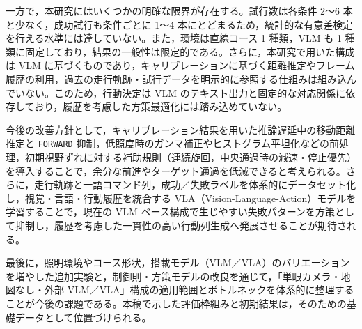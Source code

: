 \documentclass[a4paper,11pt]{ltjsreport}
\begin{document}
一方で，本研究にはいくつかの明確な限界が存在する。試行数は各条件 2〜6 本と少なく，成功試行も条件ごとに 1〜4 本にとどまるため，統計的な有意差検定を行える水準には達していない。また，環境は直線コース 1 種類，VLM も 1 種類に固定しており，結果の一般性は限定的である。さらに，本研究で用いた構成は VLM に基づくものであり，キャリブレーションに基づく距離推定やフレーム履歴の利用，過去の走行軌跡・試行データを明示的に参照する仕組みは組み込んでいない。このため，行動決定は VLM のテキスト出力と固定的な対応関係に依存しており，履歴を考慮した方策最適化には踏み込めていない。

今後の改善方針として，キャリブレーション結果を用いた推論遅延中の移動距離推定と \texttt{FORWARD} 抑制，低照度時のガンマ補正やヒストグラム平坦化などの前処理，初期視野ずれに対する補助規則（連続旋回，中央通過時の減速・停止優先）を導入することで，余分な前進やターゲット通過を低減できると考えられる。さらに，走行軌跡と一語コマンド列，成功／失敗ラベルを体系的にデータセット化し，視覚・言語・行動履歴を統合する VLA（Vision-Language-Action）モデルを学習することで，現在の VLM ベース構成で生じやすい失敗パターンを方策として抑制し，履歴を考慮した一貫性の高い行動列生成へ発展させることが期待される。

最後に，照明環境やコース形状，搭載モデル（VLM／VLA）のバリエーションを増やした追加実験と，制御則・方策モデルの改良を通じて，「単眼カメラ・地図なし・外部 VLM／VLA」構成の適用範囲とボトルネックを体系的に整理することが今後の課題である。本稿で示した評価枠組みと初期結果は，そのための基礎データとして位置づけられる。




\end{document}
